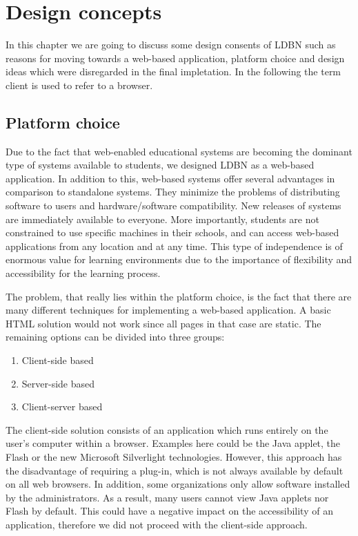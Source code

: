 \chapter{Design concepts}
\label{chap:design}
In this chapter we are going to discuss some design consents of LDBN such as
reasons for moving towards a web-based application, platform choice and 
design ideas which were disregarded in the final impletation. In the following the
term client is used to refer to a browser.

\section{Platform choice}
Due to the fact that web-enabled educational 
systems are becoming the dominant type of systems 
available to students, we designed LDBN as a web-based application.
In addition to this, web-based systems offer several advantages in comparison to 
standalone systems. They minimize the problems of distributing software to users 
and hardware/software compatibility. New releases of systems are immediately
available to everyone. More importantly, students are not
constrained to use specific machines in their schools, and can access 
web-based applications from any location and at any time. This type of independence 
is of enormous value for learning environments due to the importance of
flexibility and accessibility for the learning process.
 
The problem, that really lies within the platform choice, is the fact that there are
many different techniques for implementing a web-based application. A basic HTML 
solution would not work since all pages in that case are static. The remaining 
options can be divided into three groups:

\begin{enumerate}
	\item Client-side based
	\item Server-side based
	\item Client-server based
\end{enumerate}

The client-side solution consists of an application which runs entirely on the user's 
computer within a browser. Examples here could be the Java applet, the Flash or the new 
Microsoft Silverlight technologies. However, this approach has the disadvantage
of requiring a plug-in, which is not always available by default on all web browsers. 
In addition, some organizations only allow software installed by the administrators. 
As a result, many users cannot view Java applets nor Flash by default. This could 
have a negative impact on the accessibility of an application, 
therefore we did not proceed with the client-side approach.

